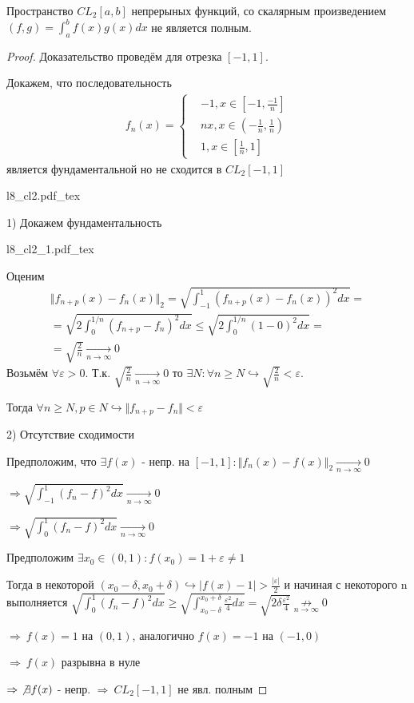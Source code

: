 \documentclass{article}
\newcommand{\incfig}[2][1]{%
    \def\svgwidth{#1\columnwidth}
    \hbox{{#2.pdf_tex}}
}
\theoremstyle{definition}
\numberwithin{theorem}{section}
\numberwithin{lemma}{section}
\numberwithin{definition}{section}
\numberwithin{corollary}{section}
\numberwithin{equation}{section}
\let\epsilon\varepsilon
\let\implies\Rightarrow
\let\true\hookrightarrow
\begin{document}
\begin{theorem}
  Пространство $CL_2[a,b]$ непрерыных функций, со скалярным произведением
  $(f,g)=\int_{a}^{b}f(x)g(x)dx$ не является полным.  
\end{theorem}
\begin{proof}
  Доказательство проведём для отрезка $[-1,1]$.

  Докажем, что последовательность
  \begin{gather*}
    f_n(x)=\left\{\begin{aligned}
      & -1, x \in [-1,\frac{-1}{n}] \\ 
      & nx, x \in (-\frac{1}{n}, \frac{1}{n}) \\ 
      & 1, x \in [\frac{1}{n},1]
    \end{aligned}\right.
  \end{gather*}
  является фундаментальной но не сходится в $CL_2[-1,1]$

  \incfig{l8_cl2}

  1) Докажем фундаментальность 

  \incfig{l8_cl2_1}

  Оценим
  \begin{gather*}
    \Vert f_{n+p}(x)-f_n(x) \Vert_2=\sqrt{\int_{-1}^{1}(f_{n+p}(x)-f_n(x))^{2}dx}= \\ 
    = \sqrt{2\int_{0}^{1/n}(f_{n+p}-f_n)^{2}dx} \le \sqrt{2\int_{0}^{1/n}(1-0)^{2}dx}= \\ 
    =\sqrt{\frac{2}{n}}\underset{n\to\infty}{\to} 0
  \end{gather*}
  Возьмём $\forall \epsilon >0$. Т.к. $\sqrt{\frac{2}{n}}\underset{n\to\infty}{\to}0$ то
  $\exists N: \forall n \ge N \true \sqrt{\frac{2}{n}}< \epsilon$.

  Тогда $\forall n \ge N, p \in N \true \Vert f_{n+p}-f_n \Vert<\epsilon$

  2) Отсутствие сходимости

  Предположим, что $\exists f(x)$ - непр. на $[-1,1]: \Vert f_n(x)-f(x) \Vert_2 \underset{n\to\infty}{\to}0$

  $\implies \sqrt{\int_{-1}^{1}(f_n-f)^{2}dx}\underset{n\to\infty}{\to}0$

  $\implies \sqrt{\int_{0}^{1}(f_n-f)^{2}dx}\underset{n\to\infty}{\to}0$

  Предположим $\exists x_0 \in (0,1): f(x_0)=1+\epsilon\neq 1$

  Тогда в некоторой $(x_0-\delta,x_0+\delta) \true |f(x)-1|> \frac{|\epsilon|}{2}$ и начиная с некоторого n выполняется
  $\sqrt{\int_{0}^{1}(f_n-f)^{2}dx}\ge \sqrt{\int_{x_0-\delta}^{x_0+\delta}\frac{\epsilon^{2}}{4}dx}=\sqrt{2\delta\frac{\epsilon^{2}}{4}} \underset{n\to\infty}{\not \to}0$

  $\implies \ f(x)=1$  на $(0,1)$, аналогично $f(x)=-1$ на $(-1,0)$

  $\implies \ f(x)$ разрывна в нуле

  $\implies \ \not \exists f(x)$ - непр. $\implies \ CL_2[-1,1]$ не явл. полным
\end{proof}
\end{document}
